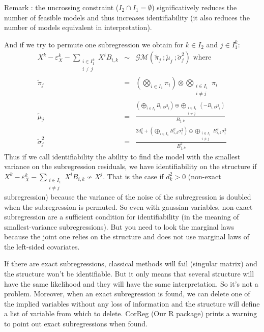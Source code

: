 \documentclass[11pt,a4paper]{article}
\begin{document}
		
		Remark : the uncrossing constraint ($I_2\cap I_1 = \emptyset$) significatively reduces the number of feasible models and thus increases identifiability (it also reduces the number of models equivalent in interpretation).
		
		And if we try to permute one subregression we obtain for $k \in I_2$ and $j \in I_1^k$:	
	\begin{eqnarray}
		X^k-\varepsilon_X^k-\sum_{\substack{i \in I_1^k \\ i\neq j }}X^iB_{i,k} &\sim&  \mathcal{GM}\left(\tilde{\pi}_j \ ; \tilde{\mu}_j \ ; \tilde{\sigma}^2_j \right) \textrm{ where} \\
		 \tilde{\pi}_j &=&  (\bigotimes_{i \in I_1}\pi_i)\otimes \bigotimes_{\substack{i \in I_1 \\ i\neq j }}\pi_i \\
		 \tilde{\mu}_j &=&   \frac{(\bigoplus_{i\in I_1} B_{i,k} \mu_i)\oplus \bigoplus_{\substack{i \in I_1 \\ i\neq j }} (-B_{i,k}\mu_i)}{B_{j,k}} \\
		 \tilde{\sigma}^2_j&=&\frac{ 2d_k^2+(\bigoplus_{i\in I_1}B_{i,k}^2 \sigma_i^2)\oplus \bigoplus_{\substack{i \in I_1 \\ i\neq j }} B_{i,k}^2 \sigma_i^2 }{B_{j,k}^2}
	\end{eqnarray}
	Thus if we call identifiability  the ability to find the model with the smallest variance on the subregression residuals, we have identifiability  on the structure if $ X^k-\varepsilon_X^k-\sum_{\substack{i \in I_1 \\ i\neq j }}X^iB_{i,k} \nsim  X^j$. That is the case if $d_k^2>0$ (non-exact subregression) because the variance of the noise of the subregression is doubled when the subregression is permuted. So even with gaussian variables, non-exact subregression are a sufficient condition for identifiability (in the meaning of smallest-variance subregressions). But you need to look the marginal laws because the joint one relies on the structure and does not use marginal laws of the left-sided covariates. 


	If there are exact subregressions, classical methods will fail (singular matrix) and the structure won't be identifiable. But it only means that several structure will have the same likelihood and they will have the same interpretation. So it's not a problem. Moreover, when an exact subregression is found, we can delete one of the implied variables without any loss of information and the structure will define a list of variable from which to delete. CorReg (Our R package) prints a warning to point out exact subregressions when found.
		
\end{document}

